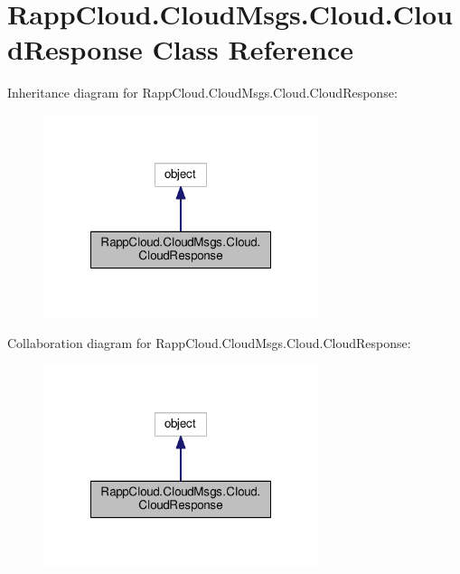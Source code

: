 \hypertarget{classRappCloud_1_1CloudMsgs_1_1Cloud_1_1CloudResponse}{\section{Rapp\-Cloud.\-Cloud\-Msgs.\-Cloud.\-Cloud\-Response Class Reference}
\label{classRappCloud_1_1CloudMsgs_1_1Cloud_1_1CloudResponse}
}


Inheritance diagram for Rapp\-Cloud.\-Cloud\-Msgs.\-Cloud.\-Cloud\-Response\-:
\nopagebreak
\begin{figure}[H]
\begin{center}
\leavevmode
\includegraphics[width=228pt]{classRappCloud_1_1CloudMsgs_1_1Cloud_1_1CloudResponse__inherit__graph}
\end{center}
\end{figure}


Collaboration diagram for Rapp\-Cloud.\-Cloud\-Msgs.\-Cloud.\-Cloud\-Response\-:
\nopagebreak
\begin{figure}[H]
\begin{center}
\leavevmode
\includegraphics[width=228pt]{classRappCloud_1_1CloudMsgs_1_1Cloud_1_1CloudResponse__coll__graph}
\end{center}
\end{figure}
